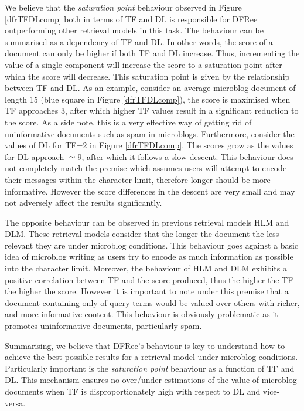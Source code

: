 We believe that the \textit{saturation point} behaviour observed in Figure \ref{dfrTFDLcomp} both in terms of TF and DL is responsible for DFRee outperforming other retrieval models in this task. The behaviour can be summarised as a dependency of TF and DL. In other words, the score of a document can only be higher if both TF and DL increase. Thus, incrementing the value of a single component will increase the score to a saturation point after which the score will decrease. This saturation point is given by the relationship between TF and DL. As an example, consider an average microblog document of length 15 (blue square in Figure \ref{dfrTFDLcomp}), the score is maximised when TF approaches 3, after which higher TF values result in a significant reduction to the score. As a side note, this is a very effective way of getting rid of uninformative documents such as spam in microblogs. Furthermore, consider the values of DL for TF=2 in Figure \ref{dfrTFDLcomp}. The scores grow as the values for DL approach $\simeq 9$, after which it follows a slow descent. This behaviour does not completely match the premise which assumes users will attempt to encode their messages within the character limit, therefore longer should be more informative. However the score differences in the descent are very small and may not adversely affect the results significantly.

The opposite behaviour can be observed in previous retrieval models HLM and DLM. These retrieval models consider that the longer the document the less relevant they are under microblog conditions. This behaviour goes against a basic idea of microblog writing as users try to encode as much information as possible into the character limit. 
Moreover, the behaviour of HLM and DLM exhibits a positive correlation between TF and the score produced, thus the higher the TF the higher the score. However it is important to note under this premise that a document containing only of query terms would be valued over others with richer, and more informative content. This behaviour is obviously problematic as it promotes uninformative documents, particularly spam.

Summarising, we believe that DFRee's behaviour is key to understand how to achieve the best possible results for a retrieval model under microblog conditions. Particularly important is the \textit{saturation point} behaviour as a function of TF and DL. This mechanism ensures no over/under estimations of the value of microblog documents when TF is disproportionately high with respect to DL and vice-versa.

